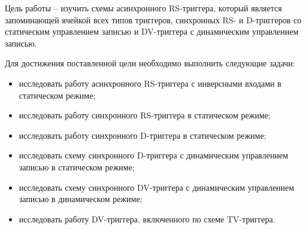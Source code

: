 \Introduction

Цель работы – изучить схемы асинхронного RS-триггера, который является
запоминающей ячейкой всех типов триггеров, синхронных RS- и D-триггеров со
статическим управлением записью и DV-триггера с динамическим управлением записью.

Для достижения поставленной цели необходимо выполнить следующие задачи:

\begin{itemize}[$\bullet$]
    \item исследовать работу асинхронного RS-триггера с инверсными входами в статическом режиме;
    \item исследовать работу синхронного RS-триггера в статическом режиме;
    \item исследовать работу синхронного D-триггера в статическом режиме;
    \item исследовать схему синхронного D-триггера с динамическим управлением записью в статическом режиме;
    \item исследовать схему синхронного DV-триггера с динамическим управлением записью в динамическом режиме;
    \item исследовать работу DV-триггера, включенного по схеме TV-триггера.
\end{itemize}
